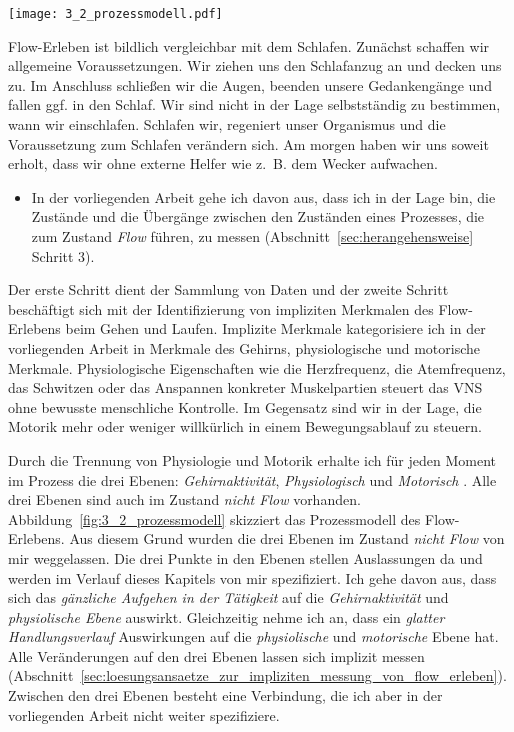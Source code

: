 \begin{sidewaysfigure}
	\texttt{[image: 3\_2\_prozessmodell.pdf]}
	\caption[Prozessmodell des Flow-Erlebens (Einführung)]{Prozessmodell mit Auslassungen der implizit messbaren Auswirkungen des Flow-Erlebens}
	\label{fig:3_2_prozessmodell}
\end{sidewaysfigure}

Flow-Erleben ist bildlich vergleichbar mit dem Schlafen. Zunächst schaffen wir allgemeine Voraussetzungen. Wir ziehen uns den Schlafanzug an und decken uns zu. Im Anschluss schließen wir die Augen, beenden unsere Gedankengänge und fallen ggf. in den Schlaf. Wir sind nicht in der Lage selbstständig zu bestimmen, wann wir einschlafen. Schlafen wir, regeniert unser Organismus und die Voraussetzung zum Schlafen verändern sich. Am morgen haben wir uns soweit erholt, dass wir ohne externe Helfer wie z.~B. dem Wecker aufwachen.

\begin{itemize}

	\item In der vorliegenden Arbeit gehe ich davon aus, dass ich in der Lage bin, die Zustände und die Übergänge zwischen den Zuständen eines Prozesses, die zum Zustand \emph{Flow} führen, zu messen (Abschnitt~\ref{sec:herangehensweise} Schritt 3).

\end{itemize}

Der erste Schritt dient der Sammlung von Daten und der zweite Schritt beschäftigt sich mit der Identifizierung von impliziten Merkmalen des Flow-Erlebens beim Gehen und Laufen. Implizite Merkmale kategorisiere ich in der vorliegenden Arbeit in Merkmale des Gehirns, physiologische und motorische Merkmale. Physiologische Eigenschaften wie die Herzfrequenz, die Atemfrequenz, das Schwitzen oder das Anspannen konkreter Muskelpartien steuert das \ac{VNS} ohne bewusste menschliche Kontrolle. Im Gegensatz sind wir in der Lage, die Motorik mehr oder weniger willkürlich in einem Bewegungsablauf zu steuern. 

Durch die Trennung von Physiologie und Motorik erhalte ich für jeden Moment im Prozess die drei Ebenen: \emph{Gehirnaktivität}, \emph{Physiologisch} und \emph{Motorisch} \citep[][S.~15]{Grueter2016a}. Alle drei Ebenen sind auch im Zustand \emph{nicht Flow} vorhanden. Abbildung~\ref{fig:3_2_prozessmodell} skizziert das Prozessmodell des Flow-Erlebens. Aus diesem Grund wurden die drei Ebenen im Zustand \emph{nicht Flow} von mir weggelassen. Die drei Punkte in den Ebenen stellen Auslassungen da und werden im Verlauf dieses Kapitels von mir spezifiziert. Ich gehe davon aus, dass sich das \emph{gänzliche Aufgehen in der Tätigkeit} auf die \emph{Gehirnaktivität} und \emph{physiolische Ebene} auswirkt. Gleichzeitig nehme ich an, dass ein \emph{glatter Handlungsverlauf} Auswirkungen auf die \emph{physiolische} und \emph{motorische} Ebene hat. Alle Veränderungen auf den drei Ebenen lassen sich implizit messen (Abschnitt~\ref{sec:loesungsansaetze_zur_impliziten_messung_von_flow_erleben}). Zwischen den drei Ebenen besteht eine Verbindung, die ich aber in der vorliegenden Arbeit nicht weiter spezifiziere. 

